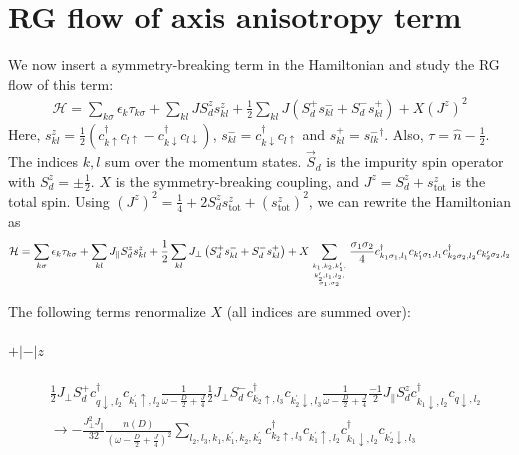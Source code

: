 \documentclass[12pt]{revtex4-2}
\begin{document}
\section{RG flow of axis anisotropy term}
We now insert a symmetry-breaking term in the Hamiltonian and study the RG flow of this term:
\begin{equation}\begin{aligned}
	\mathcal{H} = \sum_{k\sigma}\epsilon_{k}\tau_{k\sigma} + \sum_{kl} J S_d^z s^z_{kl} + \frac{1}{2}\sum_{kl} J \left(S_d^+ s^-_{kl}  + S_d^- s^+_{kl}\right) + X \left(J^z\right)^2
\end{aligned}\end{equation}
Here, \(s^z_{kl} = \frac{1}{2}\left(c^\dagger_{k\uparrow}c_{l \uparrow} - c^\dagger_{k\downarrow}c_{l \downarrow}\right)\), \(s^-_{kl} = c^\dagger_{k \downarrow}c_{l \uparrow}\) and \(s^+_{kl} = {s^-_{lk}}^\dagger\). Also, \(\tau = \hat n - \frac{1}{2}\). The indices \(k,l\) sum over the momentum states. \(\vec S_d\) is the impurity spin operator with \(S_d^z = \pm \frac{1}{2}\). \(X\) is the symmetry-breaking coupling, and \(J^z = S_d^z + s^z_\text{tot}\) is the total spin. Using \(\left(J^z\right)^2 = \frac{1}{4} + 2S_d^z s^z_\text{tot} + \left(s^z_\text{tot}\right)^2 \), we can rewrite the Hamiltonian as
\begin{equation}\begin{aligned}
	\mathcal{H} = \sum_{k\sigma}\epsilon_{k}\tau_{k\sigma} + \sum_{kl} J_\parallel S_d^z s^z_{kl} + \frac{1}{2}\sum_{kl} J_\perp \left(S_d^+ s^-_{kl}  + S_d^- s^+_{kl}\right) + X \sum_{k_1,k_2,k_1^\prime,\atop{k_2^\prime,l_1,l_2,\atop{\sigma_1,\sigma_2}}}\frac{\sigma_1\sigma_2}{4} c^\dagger_{k_1\sigma_1,l_1}c_{k_1^\prime\sigma_1,l_1}c^\dagger_{k_2\sigma_2,l_2}c_{k_2^\prime\sigma_2,l_2}
\end{aligned}\end{equation}

The following terms renormalize \(X\) (all indices are summed over):
\paragraph{\(+|-|z\)}
\begin{equation}\begin{aligned}
	&\frac{1}{2}J_\perp S_d^+ c^\dagger_{q \downarrow, l_2}c_{k_1^\prime \uparrow, l_2}\frac{1}{\omega - \frac{D}{2} + \frac{J}{4}}\frac{1}{2}J_\perp S_d^- c^\dagger_{k_2 \uparrow, l_3}c_{k_2^\prime \downarrow, l_3} \frac{1}{\omega - \frac{D}{2} + \frac{J}{4}} \frac{-1}{2}J_\parallel S_d^z c^\dagger_{k_1 \downarrow, l_2} c_{q \downarrow, l_2} \\
	&\longrightarrow -\frac{J_\perp^2 J_\parallel}{32} \frac{n(D)}{\left(\omega - \frac{D}{2} + \frac{J}{4}\right)^2}\sum_{l_2, l_3, k_1,k_1^\prime,k_2,k_2^\prime}c^\dagger_{k_2 \uparrow, l_3}c_{k_1^\prime \uparrow, l_2}c^\dagger_{k_1 \downarrow, l_2}c_{k_2^\prime \downarrow, l_3}
\end{aligned}\end{equation}
\end{document}
